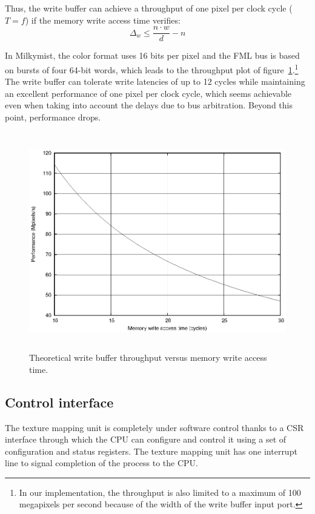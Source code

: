 \documentclass[a4paper,11pt]{kthesis}
\begin{document}
Thus, the write buffer can achieve a throughput of one pixel per clock cycle ($T = f$) if the memory write access time verifies:
\begin{equation}
\Delta_{w} \leq \frac{n \cdot w}{d} - n
\end{equation}

In Milkymist, the color format uses 16 bits per pixel and the FML bus is based on bursts of four 64-bit words, which leads to the throughput plot of figure~\ref{fig:thwbufperf}.\footnote{In our implementation, the throughput is also limited to a maximum of 100 megapixels per second because of the width of the write buffer input port.} The write buffer can tolerate write latencies of up to 12 cycles while maintaining an excellent performance of one pixel per clock cycle, which seems achievable even when taking into account the delays due to bus arbitration. Beyond this point, performance drops.

\begin{figure}[htp]
\centering
\includegraphics[height=95mm]{thwbufperf.eps}
\caption{Theoretical write buffer throughput versus memory write access time.}
\label{fig:thwbufperf}
\end{figure}

\subsection{Control interface}
\label{subsec:tmucsr}
The texture mapping unit is completely under software control thanks to a CSR interface through which the CPU can configure and control it using a set of configuration and status registers. The texture mapping unit has one interrupt line to signal completion of the process to the CPU.
\end{document}
